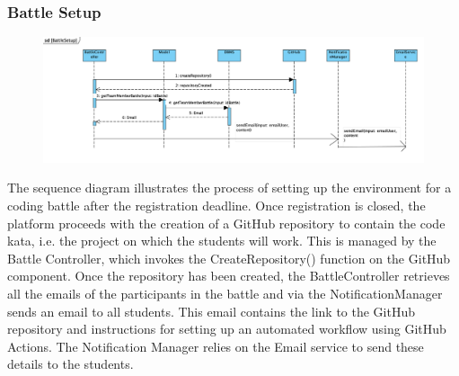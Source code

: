 \subsubsection{Battle Setup}
\begin{figure}[H]
    \centering
    \includegraphics[width=1\textwidth]{SequenceDiagram/BattleSetup.png}
    \label{fig:enter-label}
\end{figure}
The sequence diagram illustrates the process of setting up the environment for a coding battle after the registration deadline.
Once registration is closed, the platform proceeds with the creation of a GitHub repository to contain the code kata, i.e. the project on which the students will work. This is managed by the Battle Controller, which invokes the CreateRepository() function on the GitHub component.
Once the repository has been created, the BattleController retrieves all the emails of the participants in the battle and via the NotificationManager sends an email to all students. This email contains the link to the GitHub repository and instructions for setting up an automated workflow using GitHub Actions. The Notification Manager relies on the Email service to send these details to the students.
 

